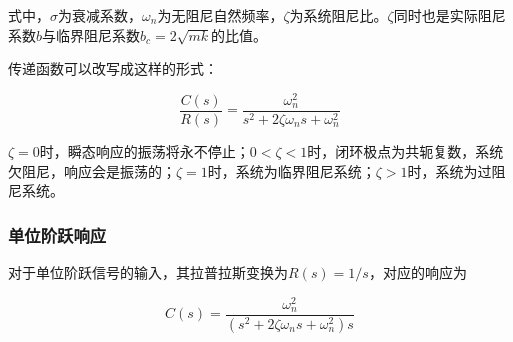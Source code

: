 式中，$\sigma$为衰减系数，$\omega_n$为无阻尼自然频率，$\zeta$为系统阻尼比。$\zeta$同时也是实际阻尼系数$b$与临界阻尼系数$b_c=2\sqrt{mk}$的比值。

传递函数可以改写成这样的形式：

\begin{equation*}
\frac{C(s)}{R(s)}=\frac{\omega_n^2}{s^2+2\zeta\omega_ns+\omega_n^2}
\end{equation*}

$\zeta=0$时，瞬态响应的振荡将永不停止；$0<\zeta<1$时，闭环极点为共轭复数，系统欠阻尼，响应会是振荡的；$\zeta=1$时，系统为临界阻尼系统；$\zeta>1$时，系统为过阻尼系统。

\subsubsection{单位阶跃响应}

对于单位阶跃信号的输入，其拉普拉斯变换为$R(s)=1/s$，对应的响应为

\begin{equation*}
C(s)=\frac{\omega_n^2}{(s^2+2\zeta\omega_ns+\omega_n^2)s}
\end{equation*}

